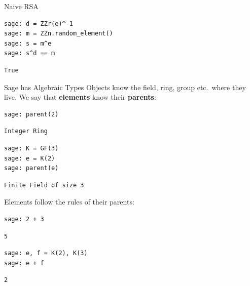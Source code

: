\documentclass[presentation,smaller]{beamer}
\begin{document}
\begin{frame}{Naive RSA}
\lstset{language=sage,label= ,caption= ,captionpos=b,numbers=none}
\begin{lstlisting}
sage: d = ZZr(e)^-1
sage: m = ZZn.random_element()
sage: s = m^e
sage: s^d == m
\end{lstlisting}

\begin{verbatim}
True
\end{verbatim}
\end{frame}

\begin{frame}{Sage has Algebraic Types}
 Objects know the field, ring, group etc. where they live. We say that \textbf{elements} know their \textbf{parents}:

\lstset{language=sage,label= ,caption= ,captionpos=b,numbers=none}
\begin{lstlisting}
sage: parent(2)
\end{lstlisting}

\begin{verbatim}
Integer Ring
\end{verbatim}

\lstset{language=sage,label= ,caption= ,captionpos=b,numbers=none}
\begin{lstlisting}
sage: K = GF(3)
sage: e = K(2)
sage: parent(e)
\end{lstlisting}

\begin{verbatim}
Finite Field of size 3
\end{verbatim}

\framebreak

Elements follow the rules of their parents:

\lstset{language=sage,label= ,caption= ,captionpos=b,numbers=none}
\begin{lstlisting}
sage: 2 + 3
\end{lstlisting}

\begin{verbatim}
5
\end{verbatim}

\lstset{language=sage,label= ,caption= ,captionpos=b,numbers=none}
\begin{lstlisting}
sage: e, f = K(2), K(3)
sage: e + f
\end{lstlisting}

\begin{verbatim}
2
\end{verbatim}

\framebreak


\end{frame}
\end{document}
